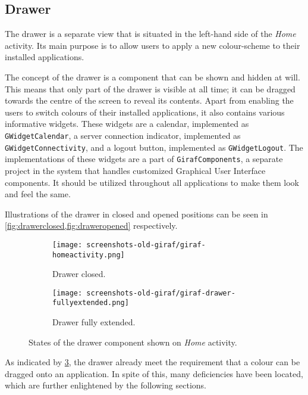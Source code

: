 \subsection{Drawer}\label{sec:launcher:drawer}
The drawer is a separate view that is situated in the left-hand side of the \textit{Home} activity.
Its main purpose is to allow \launcher users to apply a new colour-scheme to their installed \giraf applications.

The concept of the drawer is a component that can be shown and hidden at will.
This means that only part of the drawer is visible at all time; it can be dragged towards the centre of the screen to reveal its contents.
Apart from enabling the users to switch colours of their installed \giraf applications, it also contains various informative widgets.
These widgets are a calendar, implemented as \lstinline{GWidgetCalendar}, a server connection indicator, implemented as \lstinline{GWidgetConnectivity}, and a logout button, implemented as \lstinline{GWidgetLogout}.
The implementations of these widgets are a part of \lstinline{GirafComponents}, a separate project in the \giraf system that handles customized Graphical User Interface components.
It should be utilized throughout all \giraf applications to make them look and feel the same.

Illustrations of the drawer in closed and opened positions can be seen in \cref{fig:drawerclosed,fig:draweropened} respectively.

\begin{figure}[h] %
\centering
	\begin{subfigure}[b]{.48\textwidth}
	\centering
	\texttt{[image: screenshots-old-giraf/giraf-homeactivity.png]}
	\caption{Drawer closed.}
	\label{fig:drawerclosed}
	\end{subfigure}
	\hfill
	\begin{subfigure}[b]{.48\textwidth}
	\centering
	\texttt{[image: screenshots-old-giraf/giraf-drawer-fullyextended.png]}
	\caption{Drawer fully extended.}
	\label{fig:draweropened}
	\end{subfigure}
\caption{States of the drawer component shown on \textit{Home} activity.}
\label{fig:drawerstates}
\end{figure}

As indicated by \cref{fig:drawerstates}, the drawer already meet the requirement that a colour can be dragged onto an application.
In spite of this, many deficiencies have been located, which are further enlightened by the following sections.

